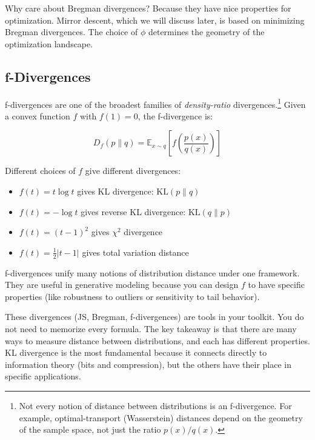 \vspace{1em}

Why care about Bregman divergences? Because they have nice properties for optimization. Mirror descent, which we will discuss later, is based on minimizing Bregman divergences. The choice of $\phi$ determines the geometry of the optimization landscape.

\vspace{1.5em}

\subsection{f-Divergences}

f-divergences are one of the broadest families of \emph{density-ratio} divergences.\footnote{Not every notion of distance between distributions is an f-divergence. For example, optimal-transport (Wasserstein) distances depend on the geometry of the sample space, not just the ratio $p(x)/q(x)$.} Given a convex function $f$ with $f(1) = 0$, the f-divergence is:

\begin{equation}
D_f(p \| q) = \mathbb{E}_{x \sim q}\left[f\left(\frac{p(x)}{q(x)}\right)\right]
\end{equation}

Different choices of $f$ give different divergences:

\begin{itemize}
\item $f(t) = t \log t$ gives KL divergence: $\text{KL}(p \| q)$

\item $f(t) = -\log t$ gives reverse KL divergence: $\text{KL}(q \| p)$

\item $f(t) = (t - 1)^2$ gives $\chi^2$ divergence

\item $f(t) = \tfrac{1}{2}|t - 1|$ gives total variation distance
\end{itemize}

\vspace{1em}

f-divergences unify many notions of distribution distance under one framework. They are useful in generative modeling because you can design $f$ to have specific properties (like robustness to outliers or sensitivity to tail behavior).

\vspace{2em}

These divergences (JS, Bregman, f-divergences) are tools in your toolkit. You do not need to memorize every formula. The key takeaway is that there are many ways to measure distance between distributions, and each has different properties. KL divergence is the most fundamental because it connects directly to information theory (bits and compression), but the others have their place in specific applications.

